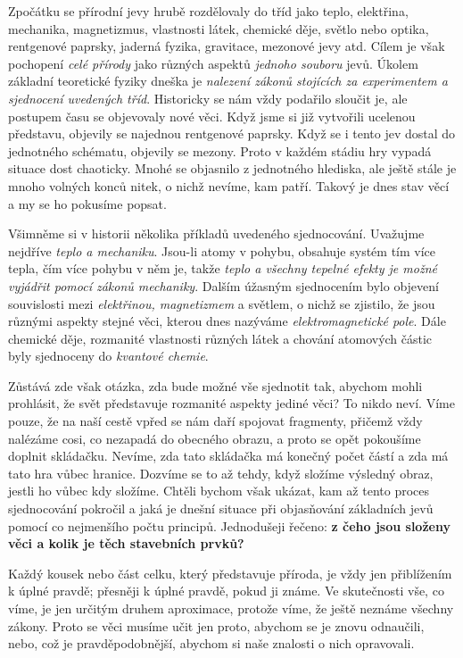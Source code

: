     Zpočátku se přírodní jevy hrubě rozdělovaly do tříd jako teplo, elektřina, mechanika, 
    magnetizmus, vlastnosti látek, chemické děje, světlo nebo optika, rentgenové paprsky, jaderná 
    fyzika, gravitace, mezonové jevy atd. Cílem je však pochopení \emph{celé přírody} jako různých 
    aspektů \emph{jednoho souboru} jevů. Úkolem základní teoretické fyziky dneška je \emph{nalezení 
    zákonů stojících za experimentem a sjednocení uvedených tříd}. Historicky se nám vždy podařilo 
    sloučit je, ale postupem času se objevovaly nové věci. Když jsme si již vytvořili ucelenou 
    představu, objevily se najednou rentgenové paprsky. Když se i tento jev dostal do jednotného 
    schématu, objevily se mezony. Proto v každém stádiu hry vypadá situace dost chaoticky. Mnohé se 
    objasnilo z jednotného hlediska, ale ještě stále je mnoho volných konců nitek, o nichž nevíme, 
    kam patří. Takový je dnes stav věcí a my se ho pokusíme popsat.
    
    Všimněme si v historii několika příkladů uvedeného sjednocování. Uvažujme nejdříve \emph{teplo 
    a mechaniku}. Jsou-li atomy v pohybu, obsahuje systém tím více tepla, čím více pohybu v něm je, 
    takže \emph{teplo a všechny tepelné efekty je možné vyjádřit pomocí zákonů mechaniky}. Dalším 
    úžasným sjednocením bylo objevení souvislosti mezi \emph{elektřinou, magnetizmem} a světlem, o 
    nichž se zjistilo, že jsou různými aspekty stejné věci, kterou dnes nazýváme 
    \emph{elektromagnetické pole}. Dále chemické děje, rozmanité vlastnosti různých látek a chování 
    atomových částic byly sjednoceny do \emph{kvantové chemie}.
    
    Zůstává zde však otázka, zda bude možné vše sjednotit tak, abychom mohli prohlásit, že svět 
    představuje rozmanité aspekty jediné věci? To nikdo neví. Víme pouze, že na naší cestě vpřed se 
    nám daří spojovat fragmenty, přičemž vždy nalézáme cosi, co nezapadá do obecného obrazu, a 
    proto se opět pokoušíme doplnit skládačku. Nevíme, zda tato skládačka má konečný počet částí a 
    zda má tato hra vůbec hranice. Dozvíme se to až tehdy, když složíme výsledný obraz, jestli ho 
    vůbec kdy složíme. Chtěli bychom však ukázat, kam až tento proces sjednocování pokročil a jaká 
    je dnešní situace při objasňování základních jevů pomocí co nejmenšího počtu principů. 
    Jednodušeji řečeno: \textbf{z čeho jsou složeny věci a kolik je těch stavebních prvků?} 
    \cite[s.~27]{Feynman02}    


    Každý kousek nebo část celku, který představuje příroda, je vždy jen přiblížením k úplné pravdě;
    přesněji k úplné pravdě, pokud ji známe. Ve skutečnosti vše, co víme, je jen určitým druhem
    aproximace, protože víme, že ještě neznáme všechny zákony. Proto se věci musíme učit jen proto,
    abychom se je znovu odnaučili, nebo, což je pravděpodobnější, abychom si naše znalosti o nich
    opravovali.
    
